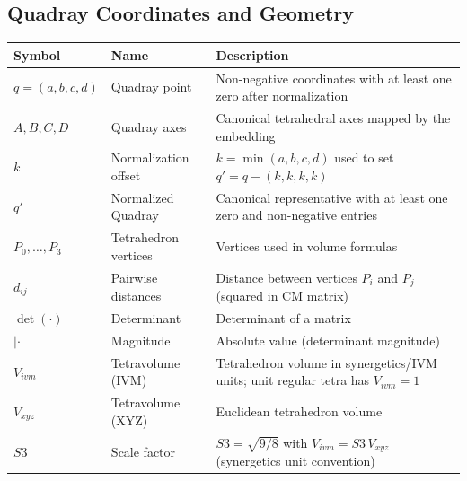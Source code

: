 \documentclass[
  10pt,
]{article}
\newcounter{none} %
\begin{document}
\subsection{Quadray Coordinates and
Geometry}\label{quadray-coordinates-and-geometry}

{\def\LTcaptype{none} %
\begin{longtable}[]{@{}
  >{\raggedright\arraybackslash}p{}
  >{\raggedright\arraybackslash}p{}
  >{\raggedright\arraybackslash}p{}@{}}
\toprule\noalign{}
\begin{minipage}[b]{\linewidth}\raggedright
Symbol
\end{minipage} & \begin{minipage}[b]{\linewidth}\raggedright
Name
\end{minipage} & \begin{minipage}[b]{\linewidth}\raggedright
Description
\end{minipage} \\
\midrule\noalign{}
\endhead
\bottomrule\noalign{}
\endlastfoot
\(q=(a,b,c,d)\) & Quadray point & Non-negative coordinates with at least
one zero after normalization \\
\(A,B,C,D\) & Quadray axes & Canonical tetrahedral axes mapped by the
embedding \\
\(k\) & Normalization offset & \(k=\min(a,b,c,d)\) used to set
\(q' = q - (k,k,k,k)\) \\
\(q'\) & Normalized Quadray & Canonical representative with at least one
zero and non-negative entries \\
\(P_0,\ldots,P_3\) & Tetrahedron vertices & Vertices used in volume
formulas \\
\(d_{ij}\) & Pairwise distances & Distance between vertices \(P_i\) and
\(P_j\) (squared in CM matrix) \\
\(\det(\cdot)\) & Determinant & Determinant of a matrix \\
\(\lvert\cdot\rvert\) & Magnitude & Absolute value (determinant
magnitude) \\
\(V_{ivm}\) & Tetravolume (IVM) & Tetrahedron volume in synergetics/IVM
units; unit regular tetra has \(V_{ivm}=1\) \\
\(V_{xyz}\) & Tetravolume (XYZ) & Euclidean tetrahedron volume \\
\(S3\) & Scale factor & \(S3=\sqrt{9/8}\) with \(V_{ivm} = S3\,V_{xyz}\)
(synergetics unit convention) \\

\end{longtable}}
\end{document}
